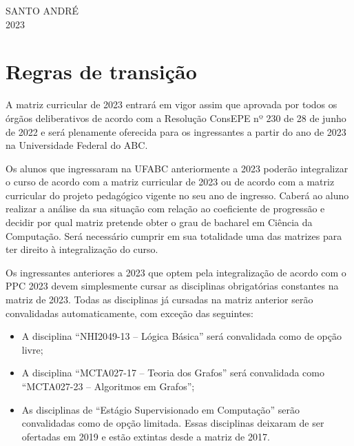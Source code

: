 \documentclass[a4paper]{article}
\begin{document}
\begin{center}
    SANTO ANDRÉ \\ 2023
\end{center}

\newpage

\section{Regras de transição}
\label{sec:regras_transicao}

A matriz curricular de 2023 entrará em vigor assim que aprovada por
todos os órgãos deliberativos de acordo com a Resolução ConsEPE nº 230
de 28 de junho de 2022 e será plenamente oferecida para os
ingressantes a partir do ano de 2023 na Universidade Federal do ABC.

Os alunos que ingressaram na UFABC anteriormente a 2023 poderão integralizar o
curso de acordo com a matriz curricular de 2023 ou de acordo com a matriz
curricular do projeto pedagógico vigente no seu ano de ingresso.
Caberá ao aluno realizar a análise da sua situação com relação ao coeficiente
de progressão e decidir por qual matriz pretende obter o grau de bacharel em
Ciência da Computação.
Será necessário cumprir em sua totalidade uma das matrizes para ter direito à
integralização do curso.

Os ingressantes anteriores a 2023 que optem pela integralização de acordo com
o PPC 2023 devem simplesmente cursar as disciplinas obrigatórias constantes na
matriz de 2023.
Todas as disciplinas já cursadas na matriz anterior serão convalidadas
automaticamente, com exceção das seguintes:
\begin{itemize}
    \item A disciplina ``NHI2049-13 -- Lógica Básica'' será convalidada como de
    opção livre;
    \item A disciplina ``MCTA027-17 -- Teoria dos Grafos'' será convalidada
    como ``MCTA027-23 -- Algoritmos em Grafos'';
    \item As disciplinas de ``Estágio Supervisionado em Computação'' serão
    convalidadas como de opção limitada. Essas disciplinas deixaram de ser
    ofertadas em 2019 e estão extintas desde a matriz de 2017.
\end{itemize}
\end{document}
